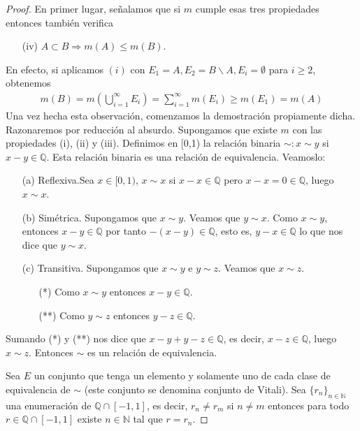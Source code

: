 \begin{proof}
    En primer lugar, señalamos que si $m$ cumple esas tres propiedades entonces también verifica
    \begin{enumerate}
        \item[(iv)] $A \subset B \Longrightarrow m(A) \leq m(B)$.
    \end{enumerate}
    En efecto, si aplicamos $(i)$ con $E_1 = A, E_2 = B \backslash A, E_i = \emptyset$ para $i \ge 2$, obtenemos
    \begin{align*}
        m(B) = m\left(\bigcup_{i=1}^{\infty}{E_i}\right) = \sum_{i=1}^{\infty}{m(E_i)} \ge m(E_1) = m(A)
    \end{align*}
    Una vez hecha esta observación, comenzamos la demostración propiamente dicha. Razonaremos por reducción al absurdo. Supongamos que existe $m$ con las propiedades (i), (ii) y (iii). Definimos en [0,1) la relación binaria $\sim: x \sim y$ si $x -y \in \mathbb{Q}$. Esta relación binaria es una relación de equivalencia. Veamoslo:
    \begin{enumerate}
        \item[(a)] Reflexiva.Sea $x \in [0,1)$, $x \sim x$ si $x - x \in \mathbb{Q}$ pero $x - x = 0 \in \mathbb{Q}$, luego $x \sim x$.
        \item[(b)] Simétrica. Supongamos que $x \sim y$. Veamos que $y \sim x$. Como $x \sim y$, entonces $x - y \in \mathbb{Q}$ por tanto $-(x-y) \in \mathbb{Q}$, esto es, $y - x \in \mathbb{Q}$ lo que nos dice que $y \sim x$.
        \item[(c)] Transitiva. Supongamos que $x \sim y$ e $y \sim z$. Veamos que $x \sim z$.
              \begin{enumerate}
                  \item[(*)] Como $x \sim y$ entonces $x - y \in \mathbb{Q}$.
                  \item[(**)] Como $y \sim z$ entonces $y - z \in \mathbb{Q}$.
              \end{enumerate}
    \end{enumerate}
    Sumando (*) y (**) nos dice que $x - y + y - z \in \mathbb{Q}$, es decir, $x - z \in \mathbb{Q}$, luego $x \sim z$. Entonces $\sim$ es un relación de equivalencia.

    Sea $E$ un conjunto que tenga un elemento y solamente uno de cada clase de equivalencia de $\sim$ (este conjunto se denomina conjunto de Vitali). Sea $\{r_n\}_{n \in \mathbb{N}}$ una enumeración de $\mathbb{Q} \cap [-1,1]$, es decir, $r_n \not = r_m$ si $n \not = m$ entonces para todo $r \in \mathbb{Q} \cap [-1,1]$ existe $n \in \mathbb{N}$ tal que $r = r_n$.


\end{proof}
